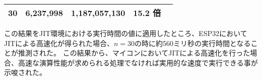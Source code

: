 \begin{table}[htbp]
\begin{center}
\begin{tabular}{rrrrr}
      30 & 6,237,998 & 1,187,057,130 & 15.2 倍 \\ \hline
    \end{tabular}
  \end{center}
\end{table}

この結果をJIT環境における実行時間の値に適用したところ、ESP32においてJITによる高速化が得られた場合、$n=30$の時に約560ミリ秒の実行時間となることが推測された。
この結果から、マイコンにおいてJITによる高速化を行った場合、高速な演算性能が求められる処理でなければ実用的な速度で実行できる事が示唆された。

